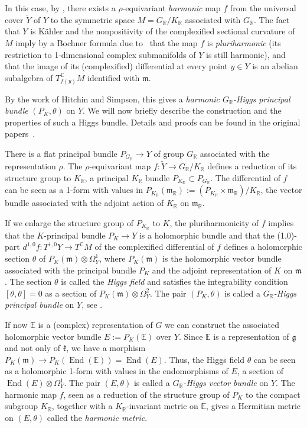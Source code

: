 \documentclass[JEP,XML,SOM,Unicode,NoFloatCountersInSection]{cedram}
\let\cites\cite
\newcommand{\citestar}[3]{\cite[#3]{#1}}
\theoremstyle{plain}
\theoremstyle{definition}
\DeclareMathOperator{\End}{End}
\newcommand{\bC}{\mathbb{C}}
\newcommand{\bE}{\mathbb{E}}
\newcommand{\bR}{\mathbb{R}}
\newcommand{\fgg}{\mathfrak{g}}
\newcommand{\fk}{\mathfrak{k}}
\newcommand{\fm}{\mathfrak{m}}
\begin{document}
In this case, by \cite{CorletteFlatGBundles},
there exists a $\rho$-equivariant \emph{harmonic} map $f$ from the universal cover $\tilde Y$ of $Y$ to the
symmetric space $M=G_\bR/K_\bR$ associated with $G_\bR$.
The fact that $Y$ is Kähler and the nonpositivity of the complexified sectional curvature of~$M$
imply by a Bochner formula due to~\cites{Sampson,Siu} that the map $f$ is \emph{pluriharmonic} (\ie its
restriction to 1-dimensional complex submanifolds of $Y$ is still harmonic), and that the image of its
(complexified) differential at every point $y\in Y$ is an abelian subalgebra of $T^\bC_{f(y)} M$
identified with $\fm$.

By the work of Hitchin and Simpson, this
gives a \emph{harmonic $G_\bR$-Higgs principal bundle} $(P_K,\theta)$ on $Y$. We will now briefly describe the
construction and the properties of such a Higgs bundle. Details and proofs can be found in the
original papers~\cites{HitchinSelfDual, HitchinLieTeich, S1, S2}.

There is a flat principal
bundle $P_{G_\bR}\to Y$ of group $G_\bR$ associated with the representation $\rho$. The $\rho$-equivariant map
$f:\tilde Y\to G_\bR/K_\bR$ defines a reduction of its structure group to $K_\bR$, \ie a principal
$K_\bR$ bundle $P_{K_\bR}\subset P_{G_\bR}$. The differential of $f$ can be seen as a 1-form with
values in $P_{K_\bR}(\fm_\bR):=(P_{K_\bR}\times\fm_\bR)/K_\bR$, the vector bundle associated with the adjoint action of $K_\bR$ on
$\fm_\bR$.

If we enlarge the structure group of $P_{K_\bR}$ to $K$,
the pluriharmonicity of $f$ implies that the $K$-principal bundle $P_K\to Y$ is a holomorphic
bundle and that the (1,0)-part $d^{1,0}f:T^{1,0}Y\to T^\bC M$ of the complexified differential
of $f$ defines a holomorphic section $\theta$ of
$P_K(\fm)\otimes\Omega^1_Y$, where $P_K(\fm)$ is the holomorphic vector bundle associated with the
principal bundle $P_K$ and the adjoint representation of $K$ on $\fm$. The section $\theta$ is called
the \emph{Higgs field} and satisfies the integrability
condition $[\theta,\theta]=0$ as a section of $P_K(\fm)\otimes\Omega^2_Y$.
The pair $(P_K,\theta)$ is called a \emph{$G_\bR$-Higgs principal bundle} on $Y$, see
\eg \citestar{BGPG2}*{}.

If now $\bE$ is a (complex) representation of $G$ we can construct the associated holomorphic vector bundle
$E:=P_K(\bE)$ over $Y$. Since $\bE$ is a representation of $\fgg$ and not only of $\fk$,
we have a morphism $P_K(\fm) \to P_K(\End(\bE)) = \End(E)$. Thus,
the Higgs field
$\theta$ can be seen as a holomorphic 1-form with values in the endomorphisms of $E$, \ie a
section of $\End(E)\otimes\Omega^1_Y$. The pair $(E,\theta)$
is called a \emph{$G_\bR$-Higgs vector bundle} on $Y$. The harmonic map $f$, seen as a reduction of the
structure group of $P_K$ to the compact subgroup $K_\bR$, together with a $K_\bR$-invariant metric on
$\bE$, gives a Hermitian metric on $(E,\theta)$
called the \emph{harmonic metric}.
\end{document}

